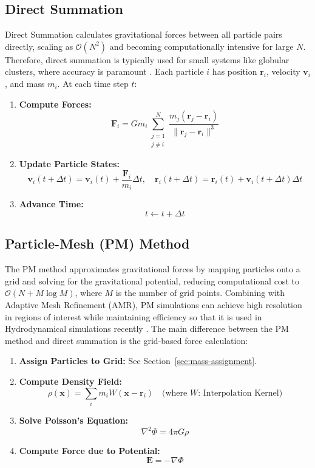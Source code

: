 \subsection{Direct Summation}
Direct Summation calculates gravitational forces between all particle pairs directly, scaling as $\mathcal{O}(N^2)$ and becoming computationally intensive for large $N$. 
Therefore, direct summation is typically used for small systems like globular clusters, where accuracy is paramount \citep{2015MNRAS.450.4070W, 2019MNRAS.484.3279P}.
Each particle $i$ has position $\mathbf{r}_i$, velocity $\mathbf{v}_i$, and mass $m_i$. At each time step $t$:
\begin{enumerate}
    \item \textbf{Compute Forces:}
    \[
    \mathbf{F}_i = G m_i \sum_{\substack{j=1 \\ j \neq i}}^{N} \frac{m_j (\mathbf{r}_j - \mathbf{r}_i)}{\|\mathbf{r}_j - \mathbf{r}_i\|^3}
    \]
    
    \item \textbf{Update Particle States:}
    \[
    \mathbf{v}_i(t + \Delta t) = \mathbf{v}_i(t) + \frac{\mathbf{F}_i}{m_i} \Delta t, \quad \mathbf{r}_i(t + \Delta t) = \mathbf{r}_i(t) + \mathbf{v}_i(t + \Delta t) \Delta t
    \]
    
    \item \textbf{Advance Time:}
    \[
    t \leftarrow t + \Delta t
    \]
\end{enumerate}

\subsection{Particle-Mesh (PM) Method} \label{sec:pm-method}
The PM method approximates gravitational forces by mapping particles onto a grid and solving for the gravitational potential, reducing computational cost to $\mathcal{O}(N + M \log M)$, where $M$ is the number of grid points. Combining with Adaptive Mesh Refinement (AMR), PM simulations can achieve high resolution in regions of interest while maintaining efficiency so that it is used in Hydrodynamical simulations recently \citep{2018MNRAS.475..676S, 2021A&A...653A.154T}.
The main difference between the PM method and direct summation is the grid-based force calculation:
\begin{enumerate}
    \item \textbf{Assign Particles to Grid:} See Section~\ref{sec:mass-assignment}.
    \item \textbf{Compute Density Field:}
    \[
    \rho(\mathbf{x}) = \sum_i m_i W(\mathbf{x} - \mathbf{r}_i) \quad \text{(where $W$: Interpolation Kernel)}
    \]
    \item \textbf{Solve Poisson's Equation:}
    \[
    \nabla^2 \Phi = 4\pi G \rho
    \]
    \item \textbf{Compute Force due to Potential:}
    \[
    \mathbf{E} = -\nabla \Phi
    \]
\end{enumerate}

